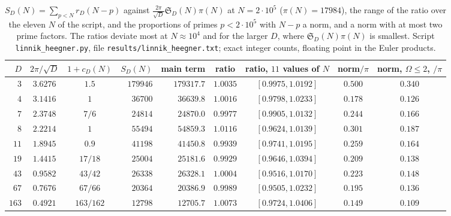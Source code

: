 \documentclass[11pt]{amsart}
\theoremstyle{definition}
\theoremstyle{remark}
\newcommand{\sS}{\mathfrak S}
\begin{document}
\begin{table}[htbp]
\centering\scriptsize\setlength{\tabcolsep}{3.5pt}
\begin{tabular}{r|cc|rrc|c|cc}
\toprule
$D$ & $2\pi/\sqrt D$ & $1+c_D(N)$ & $S_D(N)$ & main term & ratio & ratio, $11$ values of $N$ & norm$/\pi$ & norm, $\Omega\le2$, $/\pi$\\
\midrule
$3$ & $3.6276$ & $1.5$ & $179946$ & $179317.7$ & $1.0035$ & $[0.9975,1.0192]$ & $0.500$ & $0.340$\\
$4$ & $3.1416$ & $1$ & $36700$ & $36639.8$ & $1.0016$ & $[0.9798,1.0233]$ & $0.178$ & $0.126$\\
$7$ & $2.3748$ & $7/6$ & $24814$ & $24870.0$ & $0.9977$ & $[0.9905,1.0132]$ & $0.244$ & $0.166$\\
$8$ & $2.2214$ & $1$ & $55494$ & $54859.3$ & $1.0116$ & $[0.9624,1.0139]$ & $0.301$ & $0.187$\\
$11$ & $1.8945$ & $0.9$ & $41198$ & $41450.8$ & $0.9939$ & $[0.9741,1.0195]$ & $0.259$ & $0.164$\\
$19$ & $1.4415$ & $17/18$ & $25004$ & $25181.6$ & $0.9929$ & $[0.9646,1.0394]$ & $0.209$ & $0.138$\\
$43$ & $0.9582$ & $43/42$ & $26338$ & $26328.1$ & $1.0004$ & $[0.9516,1.0170]$ & $0.223$ & $0.148$\\
$67$ & $0.7676$ & $67/66$ & $20364$ & $20386.9$ & $0.9989$ & $[0.9505,1.0232]$ & $0.195$ & $0.136$\\
$163$ & $0.4921$ & $163/162$ & $12798$ & $12705.7$ & $1.0073$ & $[0.9724,1.0406]$ & $0.149$ & $0.109$\\
\bottomrule
\end{tabular}
\medskip
\caption{$S_D(N)=\sum_{p<N}r_D(N-p)$ against $\frac{2\pi}{\sqrt D}\sS_D(N)\pi(N)$ at $N=2\cdot10^5$ ($\pi(N)=17984$), the range of the ratio over the eleven $N$ of the script, and the proportions of primes $p<2\cdot10^5$ with $N-p$ a norm, and a norm with at most two prime factors. The ratios deviate most at $N\approx10^4$ and for the larger $D$, where $\sS_D(N)\pi(N)$ is smallest. Script \texttt{linnik\_heegner.py}, file \texttt{results/linnik\_heegner.txt}; exact integer counts, floating point in the Euler products.}
\label{tab:num}
\end{table}
\end{document}
